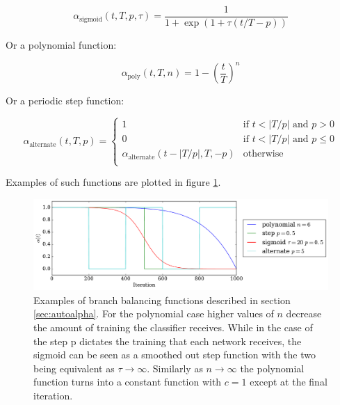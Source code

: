     \begin{equation}
      \alpha_{\text{sigmoid}}(t,T,p,\tau) = \frac{1}{1 + \exp(1 + \tau (t/T - p))}
    \end{equation}

    Or a polynomial function:

    \begin{equation}
      \alpha_{\text{poly}}(t,T,n) = 1 - \left ( \frac{t}{T} \right )^n
    \end{equation}

    Or a periodic step function:

    \begin{equation}
      \alpha_{\text{alternate}}(t,T,p) =
      \begin{cases}
        1           & \text{if } t < |T/p| \text{ and } p > 0\\
        0           & \text{if } t < |T/p| \text{ and } p \leq 0\\
        \alpha_{\text{alternate}}(t-|T/p|,T,-p)           & \text{otherwise} \\
      \end{cases}
    \end{equation}

    Examples of such functions are plotted in figure \ref{fig:alpha_functions}.

    \begin{figure}[!h]
      \centering
      \includegraphics[width =\hsize]{figures/alpha.pdf}
      \caption{Examples of branch balancing functions described in section \ref{sec:autoalpha}.
      For the polynomial case higher values of $n$ decrease the amount of training
      the classifier receives. While in the case of the step p dictates the training
      that each network receives, the sigmoid can be seen as a smoothed out step function
      with the two being equivalent as $ \tau \rightarrow \infty$. Similarly as $n \rightarrow \infty$
      the polynomial function turns into a constant function with $c=1$ except at the final
      iteration.}
      \label{fig:alpha_functions}
    \end{figure}
